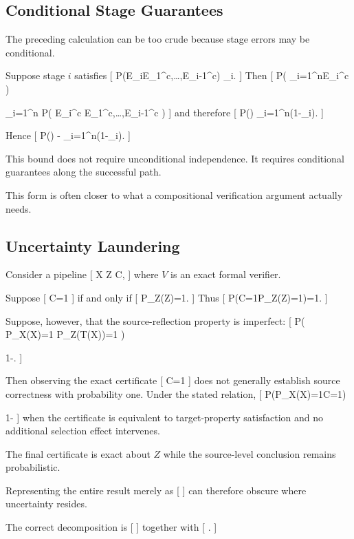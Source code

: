\documentclass[11pt]{article}
\begin{document}
\subsection{Conditional Stage Guarantees}

The preceding calculation can be too crude because stage errors may be conditional.

Suppose stage $i$ satisfies
[
P(E_i\mid E_1^c,\ldots,E_{i-1}^c)
\leq
\varepsilon_i.
]
Then
[
P\left(
\bigcap_{i=1}^{n}E_i^c
\right)

\prod_{i=1}^{n}
P(
E_i^c
\mid
E_1^c,\ldots,E_{i-1}^c
)
]
and therefore
[
P()
\geq
\prod_{i=1}^{n}(1-\varepsilon_i).
]

Hence
[
P()
-
\prod_{i=1}^{n}(1-\varepsilon_i).
]

This bound does not require unconditional independence. It requires conditional guarantees along the successful path.

This form is often closer to what a compositional verification argument actually needs.

\subsection{Uncertainty Laundering}

Consider a pipeline
[
X
Z
C,
]
where $V$ is an exact formal verifier.

Suppose
[
C=1
]
if and only if
[
P_Z(Z)=1.
]
Thus
[
P(C=1\mid P_Z(Z)=1)=1.
]

Suppose, however, that the source-reflection property is imperfect:
[
P(
P_X(X)=1
\mid
P_Z(T(X))=1
)

1-\varepsilon.
]

Then observing the exact certificate
[
C=1
]
does not generally establish source correctness with probability one. Under the stated relation,
[
P(P_X(X)=1\mid C=1)

1-\varepsilon
]
when the certificate is equivalent to target-property satisfaction and no additional selection effect intervenes.

The final certificate is exact about $Z$ while the source-level conclusion remains probabilistic.

Representing the entire result merely as
[
]
can therefore obscure where uncertainty resides.

The correct decomposition is
[
]
together with
[
.
]
\end{document}
